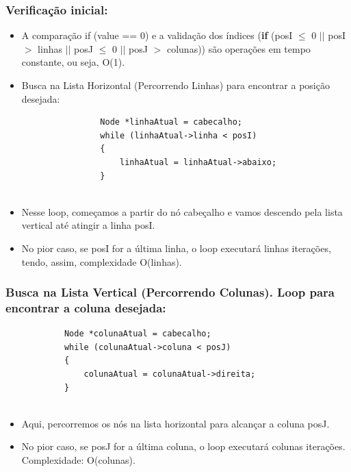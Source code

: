 \documentclass[12pt]{article}
\begin{document}
    \subsubsection{Verificação inicial:}
        \begin{itemize}
            \item A comparação if (value == 0) e a validação dos índices (\textbf{if} (posI \(\leq\) 0 \(||\) posI \(>\) linhas \(||\) posJ \(\leq\) 0 \(||\) posJ \(>\) colunas)) são operações em tempo constante, ou seja, O(1).
    
            \item Busca na Lista Horizontal (Percorrendo Linhas) para encontrar a posição desejada:
            \begin{lstlisting}
                Node *linhaAtual = cabecalho;
                while (linhaAtual->linha < posI)
                {
                    linhaAtual = linhaAtual->abaixo;
                }
        
            \end{lstlisting}
            \item Nesse loop, começamos a partir do nó cabeçalho e vamos descendo pela lista vertical até atingir a linha posI. 
            
            \item No pior caso, se posI for a última linha, o loop executará linhas iterações, tendo, assim, complexidade O(linhas). 
        \end{itemize}
    
    \subsubsection{Busca na Lista Vertical (Percorrendo Colunas). Loop para encontrar a coluna desejada:}
        \begin{lstlisting}
            Node *colunaAtual = cabecalho;
            while (colunaAtual->coluna < posJ)
            {
                colunaAtual = colunaAtual->direita;
            }
        
        \end{lstlisting}
        \begin{itemize}
                \item Aqui, percorremos os nós na lista horizontal para alcançar a coluna posJ. 
                
                \item No pior caso, se posJ for a última coluna, o loop executará colunas iterações. Complexidade: O(colunas).
        \end{itemize}
\end{document}
